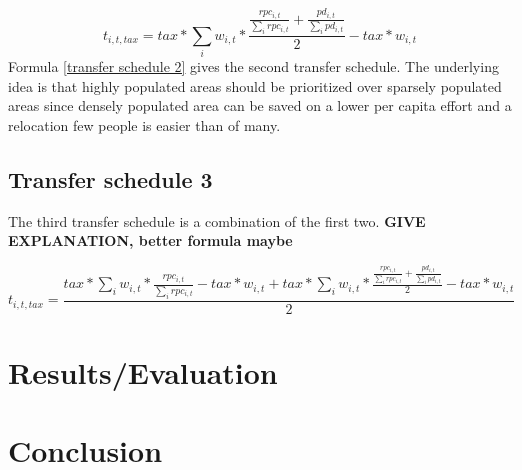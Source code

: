 \documentclass[10pt,a4]{article}
\begin{document}
\begin{equation}
    t_{i,t,tax} = tax * \sum_i w_{i,t} * \frac{\frac{rpc_{i,t}}{\sum_i rpc_{i,t}} + \frac{pd_{i,t}}{\sum_i pd_{i,t}}}{2} - tax * w_{i,t}
    \label{transfer schedule 2}
\end{equation}
Formula \ref{transfer schedule 2} gives the second transfer schedule. The underlying idea is that highly populated areas should be prioritized over sparsely populated areas since densely populated area can be saved on a lower per capita effort and a relocation few people is easier than of many.

\subsection{Transfer schedule 3}
The third transfer schedule is a combination of the first two. \textbf{GIVE EXPLANATION, better formula maybe}

\begin{equation}
    t_{i,t,tax} = \frac{tax * \sum_i w_{i,t} * \frac{rpc_{i,t}}{\sum_i rpc_{i,t}} - tax * w_{i,t} + tax * \sum_i w_{i,t} * \frac{\frac{rpc_{i,t}}{\sum_i rpc_{i,t}} + \frac{pd_{i,t}}{\sum_i pd_{i,t}}}{2} - tax * w_{i,t}}{2} 
    \label{transfer schedule 3}
\end{equation}


\section{Results/Evaluation}

\section{Conclusion}

\printbibliography
\end{document}
